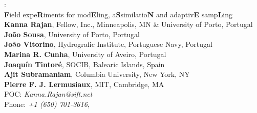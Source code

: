 \begin{titlepage}


\begin{center}
\Large
\proje:\\\textbf{F}ield expe\textbf{R}iments for mod\textbf{E}ling, a\textbf{S}similatio\textbf{N} and adaptiv\textbf{E} samp\textbf{L}ing\\

\vspace{+5in}
\large
\textbf{Kanna Rajan}, Fellow, \org Inc., Minneapolis, MN \& University of Porto, Portugal\\
\textbf{Jo\~ao Sousa}, University of Porto, Portugal\\
\textbf{Jo\~ao Vitorino}, Hydrografic Institute, Portuguese Navy, Portugal\\
\textbf{Marina R. Cunha}, University of Aveiro, Portugal\\
\textbf{Joaqu\'{i}n Tintor\'{e}}, SOCIB, Balearic Islands, Spain\\
\textbf{Ajit Subramaniam}, Columbia University, New York, NY\\
\textbf{Pierre F. J. Lermusiaux}, MIT, Cambridge, MA\\
POC: \emph{Kanna.Rajan@sift.net}\\
Phone: \emph{+1 (650) 701-3616}, \\
\vspace{+0.5in}

\end{center}


\end{titlepage}
